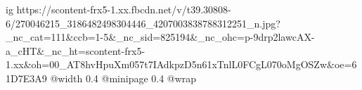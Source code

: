  
 
 
 
 

\ifcmt
  ig https://scontent-frx5-1.xx.fbcdn.net/v/t39.30808-6/270046215_3186482498304446_4207003838788312251_n.jpg?_nc_cat=111&ccb=1-5&_nc_sid=825194&_nc_ohc=p-9drp2lawcAX-a_cHT&_nc_ht=scontent-frx5-1.xx&oh=00_AT8hvHpuXm057t7IAdkpzD5n61xTnlL0FCgL070oMgOSZw&oe=61D7E3A9
  @width 0.4
  @minipage 0.4
  @wrap \parpic[r]
\fi
